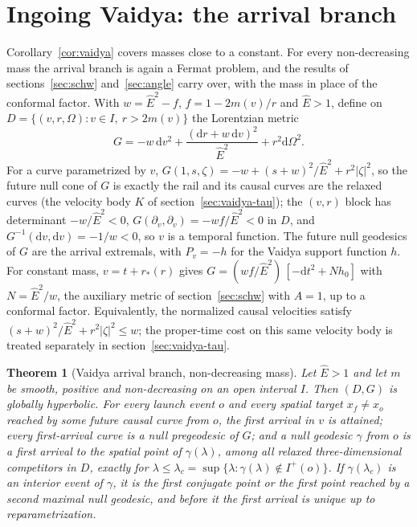 \documentclass[aip,jmp,amsmath,amssymb,reprint]{revtex4-2}
\newcommand{\Ehat}{\hat E}
\newcommand{\dd}{\mathrm{d}}
\theoremstyle{plain}
\newtheorem{theorem}{Theorem}
\theoremstyle{definition}
\begin{document}
\section{Ingoing Vaidya: the arrival branch}
\label{sec:vaidya-arrival}
Corollary~\ref{cor:vaidya} covers masses close to a constant. For every non-decreasing mass the
arrival branch is again a Fermat problem, and the results of sections~\ref{sec:schw}
and~\ref{sec:angle} carry over, with the mass in place of the conformal factor. With $w=\Ehat^2-f$, $f=1-2m(v)/r$ and $\Ehat>1$, define on
$D=\{(v,r,\Omega):v\in I,\ r>2m(v)\}$ the Lorentzian metric
\begin{equation}
  G=-w\,\dd v^2+\frac{(\dd r+w\,\dd v)^2}{\Ehat^2}+r^2\dd\Omega^2 .
  \label{eq:vaidya-G}
\end{equation}
For a curve parametrized by $v$, $G(1,s,\zeta)=-w+(s+w)^2/\Ehat^2+r^2|\zeta|^2$, so the future null
cone of $G$ is exactly the rail and its causal curves are the relaxed curves (the velocity body
$K$ of section~\ref{sec:vaidya-tau}); the $(v,r)$ block has determinant $-w/\Ehat^2<0$,
$G(\partial_v,\partial_v)=-wf/\Ehat^2<0$ in $D$, and $G^{-1}(\dd v,\dd v)=-1/w<0$, so $v$ is a temporal
function. The future null geodesics of $G$ are the arrival extremals, with $P_v=-h$ for the Vaidya
support function $h$. For constant mass, $v=t+r_*(r)$ gives
$G=(wf/\Ehat^2)\,[-\dd t^2+N h_0]$ with $N=\Ehat^2/w$, the auxiliary metric of
section~\ref{sec:schw} with $A=1$, up to a conformal factor. Equivalently, the normalized causal
velocities satisfy $(s+w)^2/\Ehat^2+r^2|\zeta|^2\le w$; the proper-time cost on this same velocity
body is treated separately in section~\ref{sec:vaidya-tau}.

\begin{theorem}[Vaidya arrival branch, non-decreasing mass]\label{thm:vaidya-arrival}
Let $\Ehat>1$ and let $m$ be smooth, positive and non-decreasing on an open interval $I$. Then
$(D,G)$ is globally hyperbolic. For every launch event $o$ and every spatial target $x_f\ne x_o$
reached by some future causal curve from $o$, the first arrival in $v$ is attained; every
first-arrival curve is a null pregeodesic of $G$; and a null geodesic $\gamma$ from $o$ is a first
arrival to the spatial point of $\gamma(\lambda)$, among all relaxed three-dimensional
competitors in $D$, exactly for $\lambda\le\lambda_c=\sup\{\lambda:\gamma(\lambda)\notin I^+(o)\}$.
If $\gamma(\lambda_c)$ is an interior event of $\gamma$, it is the first conjugate point or the first
point reached by a second maximal null geodesic, and before it the first arrival is unique up to
reparametrization.
\end{theorem}
\end{document}
